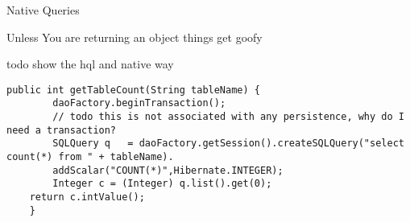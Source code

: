 Native Queries

Unless You are returning an object things get goofy

todo show the hql and native way
\begin{verbatim}
public int getTableCount(String tableName) {
		daoFactory.beginTransaction();
		// todo this is not associated with any persistence, why do I need a transaction?
		SQLQuery q   = daoFactory.getSession().createSQLQuery("select count(*) from " + tableName).
		addScalar("COUNT(*)",Hibernate.INTEGER);
		Integer c = (Integer) q.list().get(0);
	return c.intValue();
	}
\end{verbatim}